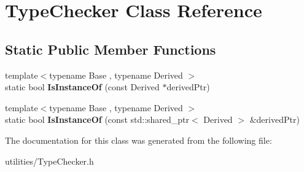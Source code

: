 \hypertarget{classTypeChecker}{\section{Type\-Checker Class Reference}
\label{classTypeChecker}
}
\subsection*{Static Public Member Functions}
\begin{DoxyCompactItemize}
\item 
\hypertarget{classTypeChecker_a0a0d73da592a8598bf316b55e7d94efe}{{\footnotesize template$<$typename Base , typename Derived $>$ }\\static bool {\bfseries Is\-Instance\-Of} (const Derived $\ast$derived\-Ptr)}\label{classTypeChecker_a0a0d73da592a8598bf316b55e7d94efe}

\item 
\hypertarget{classTypeChecker_a9a7b060e6f33fce02cc87a70f36ec0b1}{{\footnotesize template$<$typename Base , typename Derived $>$ }\\static bool {\bfseries Is\-Instance\-Of} (const std\-::shared\-\_\-ptr$<$ Derived $>$ \&derived\-Ptr)}\label{classTypeChecker_a9a7b060e6f33fce02cc87a70f36ec0b1}

\end{DoxyCompactItemize}


The documentation for this class was generated from the following file\-:\begin{DoxyCompactItemize}
\item 
utilities/Type\-Checker.\-h\end{DoxyCompactItemize}
